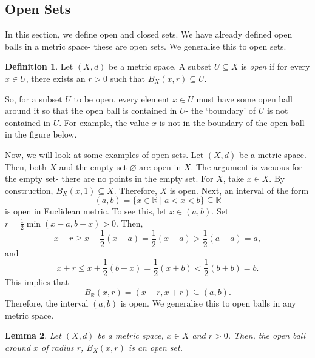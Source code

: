 \documentclass[a4paper, openany]{memoir}
\theoremstyle{definition}
\newtheorem{definition}{Definition}[section]
\theoremstyle{plain}
\newtheorem{lemma}[definition]{Lemma}
\begin{document}
\subsection{Open Sets}
In this section, we define open and closed sets. We have already defined open balls in a metric space- these are open sets. We generalise this to open sets.
\begin{definition}
Let $(X, d)$ be a metric space. A subset $U \subseteq X$ is \emph{open} if for every $x \in U$, there exists an $r > 0$ such that $B_X(x, r) \subseteq U$.
\end{definition}
\noindent So, for a subset $U$ to be open, every element $x \in U$ must have some open ball around it so that the open ball is contained in $U$- the `boundary' of $U$ is not contained in $U$. For example, the value $x$ is not in the boundary of the open ball in the figure below.
\begin{figure}[H]
    \centering
\end{figure}
Now, we will look at some examples of open sets. Let $(X, d)$ be a metric space. Then, both $X$ and the empty set $\varnothing$ are open in $X$. The argument is vacuous for the empty set- there are no points in the empty set. For $X$, take $x \in X$. By construction, $B_X(x, 1) \subseteq X$. Therefore, $X$ is open. Next, an interval of the form 
\[(a, b) = \{x \in \mathbb{R} \mid a < x < b\} \subseteq \mathbb{R}\]
is open in Euclidean metric. To see this, let $x \in (a, b)$. Set $r = \frac{1}{2} \min(x - a, b - x) > 0$. Then,
\[x - r \geqslant x - \frac{1}{2}(x - a) = \frac{1}{2}(x + a) > \frac{1}{2}(a + a) = a,\]
and
\[x + r \leqslant x + \frac{1}{2}(b - x) = \frac{1}{2}(x + b) < \frac{1}{2}(b + b)= b.\]
This implies that 
\[B_{\mathbb{R}}(x, r) = (x-r, x+r) \subseteq (a, b).\]
Therefore, the interval $(a, b)$ is open. We generalise this to open balls in any metric space.
\begin{lemma}
Let $(X, d)$ be a metric space, $x \in X$ and $r > 0$. Then, the open ball around $x$ of radius $r$, $B_X(x, r)$ is an open set.
\end{lemma}
\end{document}
